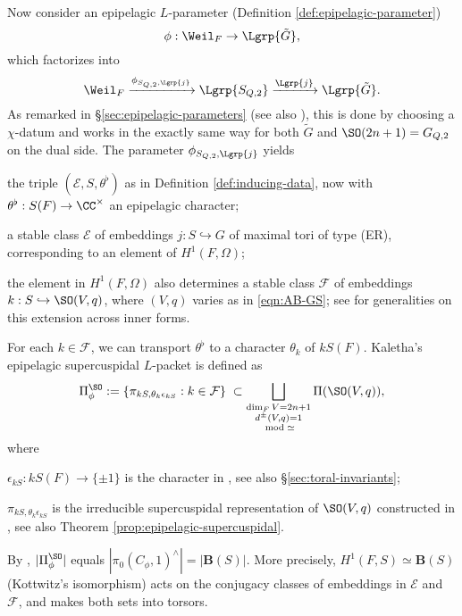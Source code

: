 \documentclass[a4paper,10pt]{article}
\begin{document}
Now consider an epipelagic $L$-parameter (Definition \ref{def:epipelagic-parameter})
\[ \phi: \Weil_F \to \Lgrp{\tilde{G}}, \]
which factorizes into
\[ \Weil_F \xrightarrow{\phi_{S_{Q,2}, \Lgrp{j}} } \Lgrp{S_{Q,2}} \xrightarrow{\Lgrp{j}} \Lgrp{\tilde{G}}. \]
As remarked in \S\ref{sec:epipelagic-parameters} (see also \cite[\S 5]{Kal15}), this is done by choosing a $\chi$-datum and works in the exactly same way for both $\tilde{G}$ and $\SO(2n+1) = G_{Q,2}$ on the dual side.  The parameter $\phi_{S_{Q,2}, \Lgrp{j}}$ yields
\begin{compactitem}
	\item the triple $(\mathcal{E}, S, \theta^\flat)$ as in Definition \ref{def:inducing-data}, now with $\theta^\flat: S(F) \to \CC^\times$ an epipelagic character;
	\item a stable class $\mathcal{E}$ of embeddings $j: S \hookrightarrow G$ of maximal tori of type (ER), corresponding to an element of $H^1(F, \Omega)$;
	\item the element in $H^1(F, \Omega)$ also determines a stable class $\mathcal{F}$ of embeddings $k: S \hookrightarrow \SO(V,q)$, where $(V,q)$ varies as in \eqref{eqn:AB-GS}; see \cite[\S 3.2]{Kal16} for generalities on this extension across inner forms.
\end{compactitem}
For each $k \in \mathcal{F}$, we can transport $\theta^\flat$ to a character $\theta_k$ of $kS(F)$. Kaletha's epipelagic supercuspidal $L$-packet is defined as
\begin{equation*}
	\Pi^{\SO}_\phi := \left\{ \pi_{kS, \theta_k \epsilon_{kS}} : k \in \mathcal{F} \right\} \; \subset \bigsqcup_{\substack{\dim_F V = 2n+1 \\ d^\pm(V,q) = 1 \\ \bmod \simeq }} \Pi(\SO(V,q)),
\end{equation*}
where
\begin{compactitem}
	\item $\epsilon_{kS}: kS(F) \to \{\pm 1\}$ is the character in \cite[\S 4.6]{Kal15}, see also \S\ref{sec:toral-invariants};
	\item $\pi_{kS, \theta_k \epsilon_{kS}}$ is the irreducible supercuspidal representation of $\SO(V,q)$ constructed in \cite[\S 3]{Kal15}, see also Theorem \ref{prop:epipelagic-supercuspidal}.
\end{compactitem}

\begin{remark}\label{rem:SO-packet-size}
	By \cite[Proposition 5.7]{Kal15}, $|\Pi^{\SO}_\phi|$ equals $|\pi_0(C_\phi, 1)^\wedge| = |\mathbf{B}(S)|$. More precisely, $H^1(F,S) \simeq \mathbf{B}(S)$ (Kottwitz's isomorphism) acts on the conjugacy classes of embeddings in $\mathcal{E}$ and $\mathcal{F}$, and makes both sets into torsors.
\end{remark}
\end{document}
